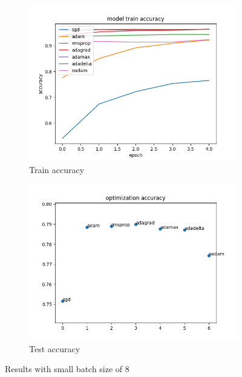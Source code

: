 \documentclass{article}
\begin{document}
\begin{figure}[H]
    \centering
    \begin{subfigure}[b]{0.7\textwidth}
        \includegraphics[width=\textwidth]{smallbatchtrainacc.png}
        \caption{Train accuracy}
        \label{fig:smalltrainacc}
    \end{subfigure}
    \begin{subfigure}[b]{0.7\textwidth}
        \includegraphics[width=\textwidth]{smalbatchtestacc.png}
        \caption{Test accuracy}
        \label{fig:smalltestacc}
    \end{subfigure}
    \caption{Results with small batch size of 8}\label{fig:rsb}
\end{figure}
\end{document}
